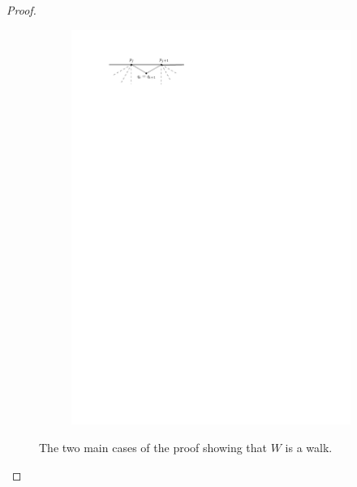 \begin{proof}
\begin{figure}[b]
\begin{subfigure}[b]{0.5\linewidth}
            \includegraphics[width=\linewidth]{unifiedAlgo/img/walkProofB}
            \vspace{1cm}
            \caption{ }
        \end{subfigure}
        \caption{The two main cases of the proof showing that $W$ is a walk.}
        \label{fig:uni:walkproof}
      \end{figure}
    \end{proof}

